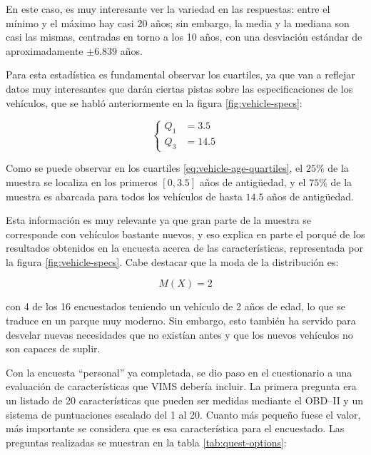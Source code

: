 En este caso, es muy interesante ver la variedad en las respuestas: entre el mínimo
y el máximo hay casi 20 años; sin embargo, la media y la mediana son casi las mismas,
centradas en torno a los 10 años, con una desviación estándar de aproximadamente
$\pm 6.839$ años.

Para esta estadística es fundamental observar los cuartiles, ya que van a reflejar
datos muy interesantes que darán ciertas pistas sobre las especificaciones de los
vehículos, que se habló anteriormente en la figura \ref{fig:vehicle-specs}:

\begin{equation}\label{eq:vehicle-age-quartiles}
  \left\{
  \begin{aligned}
    Q_1 & = 3.5  \\
    Q_3 & = 14.5
  \end{aligned}
  \right.
\end{equation}

Como se puede observar en los cuartiles \ref{eq:vehicle-age-quartiles}, el $25\%$ de
la muestra se localiza en los primeros $\left[0, 3.5\right]$ años de antigüedad, y el
$75\%$ de la muestra es abarcada para todos los vehículos de hasta $14.5$ años de
antigüedad.

Esta información es muy relevante ya que gran parte de la muestra se corresponde con
vehículos bastante nuevos, y eso explica en parte el porqué de los resultados obtenidos
en la encuesta acerca de las características, representada por la figura \ref{fig:vehicle-specs}.
Cabe destacar que la moda de la distribución es:

\begin{equation}\label{eq:vehicle-age-mode}
  M\left(X\right) = 2
\end{equation}

con 4 de los 16 encuestados teniendo un vehículo de 2 años de edad, lo que se traduce
en un parque muy moderno. Sin embargo, esto también ha servido para desvelar nuevas
necesidades que no existían antes y que los nuevos vehículos no son capaces de
suplir.

Con la encuesta ``personal'' ya completada, se dio paso en el cuestionario a una
evaluación de características que \ac{VIMS} debería incluir. La primera pregunta era
un listado de 20 características que pueden ser medidas mediante el \ac{OBD}--II
y un sistema de puntuaciones escalado del 1 al 20. Cuanto más pequeño fuese el valor,
más importante se considera que es esa característica para el encuestado. Las preguntas
realizadas se muestran en la tabla \ref{tab:quest-options}:

